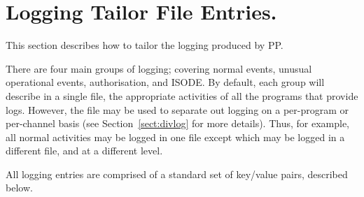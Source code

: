 \section{Logging Tailor File Entries.}
This section describes how to tailor the logging produced by PP.

There are four main groups of logging; covering normal events, unusual
operational events, authorisation, and ISODE.  By default, each group
will describe in a single file, the appropriate activities of all the
programs that provide logs.  However, the  file may be used to
separate out logging on a per-program or per-channel basis (see
Section~\ref{sect:divlog} for more details).  Thus, for
example, all normal activities may be logged in one file except
 which may be logged in a different file, and at a different
level.

All logging entries are comprised of a standard set of 
key/value pairs, described below. 
 
